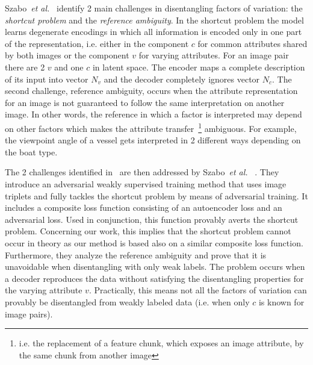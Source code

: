 \documentclass[a4paper,12pt]{report}
\begin{document}
Szabo~\textit{et al.}~\cite{ChallengInDisentIFoF} identify 2 main challenges in disentangling factors of variation: the \textit{shortcut problem} and the \textit{reference ambiguity}. In the shortcut problem the model learns degenerate encodings in which all information is encoded only in one part of the representation, i.e. either in the component $c$ for common attributes shared by both images or the component $v$ for varying attributes. For an image pair there are 2 $v$ and one $c$ in latent space. The encoder maps a complete description of its input into vector $N_v$ and the decoder completely ignores vector $N_c$.
The second challenge, reference ambiguity, occurs when the attribute representation for an image is not guaranteed to follow the same interpretation on another image. In other words, the reference in which a factor is interpreted may depend on other factors which makes the attribute transfer~\footnote{i.e. the replacement of a feature chunk, which exposes an image attribute, by the same chunk from another image} ambiguous. For example, the viewpoint angle of a vessel gets interpreted in 2 different ways depending on the boat type.
\par The 2 challenges identified in~\cite{ChallengInDisentIFoF} are then addressed by Szabo~\textit{et al.}~ \cite{UnderstDegenAndAmbInAT}. They introduce an adversarial weakly supervised training method that uses image triplets and fully tackles the shortcut problem by means of adversarial training. It includes a composite loss function consisting of an autoencoder loss and an adversarial loss. Used in conjunction, this function provably averts the shortcut problem. Concerning our work, this implies that the shortcut problem cannot occur in theory as our method is based also on a similar composite loss function. Furthermore, they analyze the reference ambiguity and prove that it is unavoidable when disentangling with only weak labels. The problem occurs when a decoder reproduces the data without satisfying the disentangling properties for the varying attribute $v$. Practically, this means not all the factors of variation can provably be disentangled from weakly labeled data (i.e. when only $c$ is known for image pairs).    
\end{document}
